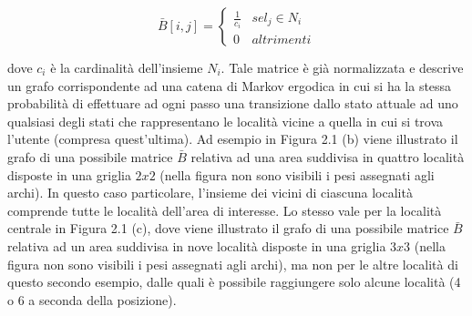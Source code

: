 \begin{equation}
\bar{B}[i,j] =
\left\{\begin{matrix}
\frac{1}{c_{i}} & se l_{j} \in N_{i}\\
0 & altrimenti
\end{matrix}\right.
\end{equation}

dove $c_{i}$ \`e la cardinalit\`a dell'insieme $N_{i}$. Tale matrice \`e gi\`a normalizzata e
descrive un grafo corrispondente ad una catena di Markov ergodica in cui si
ha la stessa probabilit\`a di effettuare ad ogni passo una transizione dallo stato
attuale ad uno qualsiasi degli stati che rappresentano le localit\`a vicine a quella
in cui si trova l'utente (compresa quest'ultima).
Ad esempio in Figura 2.1 (b) viene illustrato il grafo di una possibile matrice
$\bar{B}$ relativa ad una area suddivisa in quattro localit\`a disposte in una griglia
$2 x 2$ (nella figura non sono visibili i pesi assegnati agli archi). In questo caso
particolare, l'insieme dei vicini di ciascuna localit\`a comprende tutte le localit\`a
dell'area di interesse. Lo stesso vale per la localit\`a centrale in Figura 2.1 (c),
dove viene illustrato il grafo di una possibile matrice $\bar{B}$ relativa ad un area
suddivisa in nove localit\`a disposte in una griglia $3 x 3$ (nella figura non sono
visibili i pesi assegnati agli archi), ma non per le altre localit\`a di questo secondo
esempio, dalle quali \`e possibile raggiungere solo alcune localit\`a (4 o 6 a seconda
della posizione).

